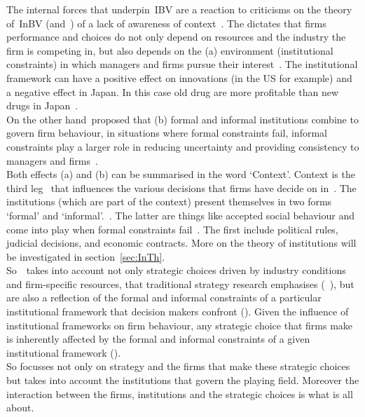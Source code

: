 The internal forces that underpin~\gls{IBV} are a reaction to criticisms on the theory of~\gls{InBV} (and~\rbv) of a lack of awareness of context~\cite{Narayanan:2005}.  
The \ibv dictates that firms performance and choices do not only depend on resources and the industry the firm is competing in, but also depends on the (a) environment (institutional constraints) in which managers and firms pursue their interest~\cite{Peng:2008b}.%
The institutional framework can have a positive effect on innovations (in the US for example) and a negative effect in Japan. 
In this case old drug are more profitable than new drugs in Japan~\cite{Peng:2008b}. \\
On the other hand~\ibv proposed that (b) formal and informal institutions combine to govern firm behaviour, in situations where formal constraints fail, informal constraints play a larger role in reducing uncertainty and providing consistency to managers and firms~\cite{Peng:2008b}. \\
Both effects (a) and (b) can be summarised in the word `Context'. Context is the third leg~\cite{Peng:2009} that influences the various decisions that firms have decide on in~\ib. 
The institutions (which are part of the context) present themselves in two forms `formal' and `informal'.~\cite{Peng:2002}. The latter are things like accepted social behaviour and come into play when formal constraints fail~\cite{North:1990,DiMaggio:1983,Scott:1995}. The first include political rules, judicial decisions, and economic contracts. More on the theory of institutions will be investigated in section~\ref{sec:InTh}.\\
So~\ibv~takes into account not only strategic choices driven by industry conditions and firm-specific resources, that traditional strategy research emphasises (~\cite{Porter:1980,Barney:1991}), but are also a reflection of the formal and informal constraints of a particular institutional framework that decision makers confront (\cite{Oliver:1997,Scott:1995}). Given the influence of institutional frameworks on firm behaviour, any strategic choice that firms make is inherently affected by the formal and informal constraints of a given institutional framework (\cite{North:1990,Oliver:1997}). \\

So \ibv focusses not only on strategy and the firms that make these strategic choices but takes into account the institutions that govern the playing field. Moreover the interaction between the firms, institutions and the strategic choices is what \ibv is all about.\\
